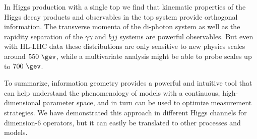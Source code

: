 In Higgs production with a single top we find that kinematic
properties of the Higgs decay products and observables in the top
system provide orthogonal information. The transverse momenta of the
di-photon system as well as the rapidity separation of the
$\gamma \gamma$ and $bjj$ systems are powerful observables. But even
with HL-LHC data these distributions are only sensitive to new physics
scales around $550~\gev$, while a multivariate analysis might be able
to probe scales up to $700~\gev$.\bigskip

To summarize, information geometry provides a powerful and intuitive
tool that can help understand the phenomenology of models with a
continuous, high-dimensional parameter space, and in turn can be used
to optimize measurement strategies.  We have demonstrated this
approach in different Higgs channels for dimension-6 operators, but
it can easily be translated to other processes and models.
